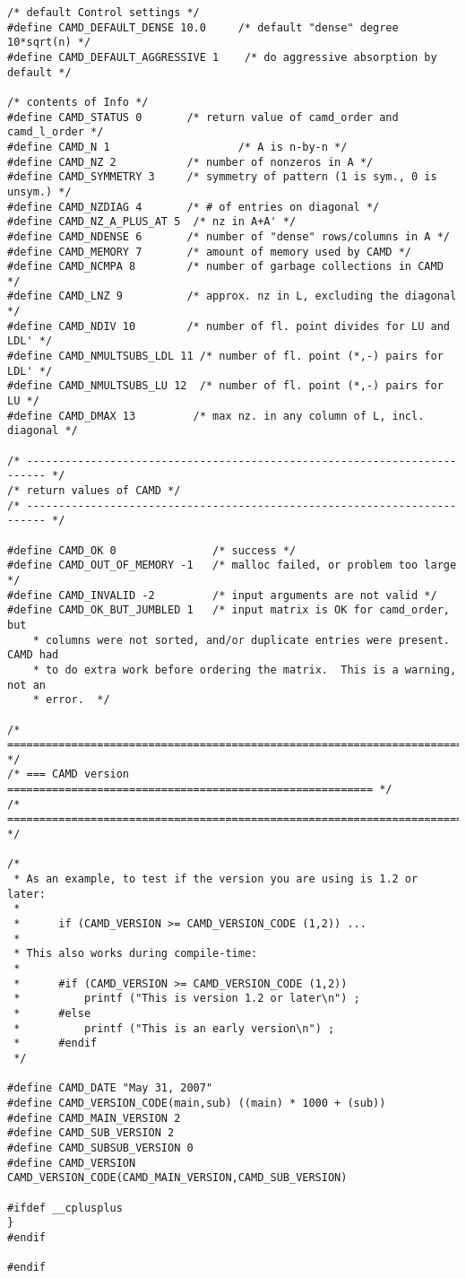 \documentclass[11pt]{article}
\begin{document}
{\begin{verbatim}
/* default Control settings */
#define CAMD_DEFAULT_DENSE 10.0     /* default "dense" degree 10*sqrt(n) */
#define CAMD_DEFAULT_AGGRESSIVE 1    /* do aggressive absorption by default */

/* contents of Info */
#define CAMD_STATUS 0       /* return value of camd_order and camd_l_order */
#define CAMD_N 1                    /* A is n-by-n */
#define CAMD_NZ 2           /* number of nonzeros in A */ 
#define CAMD_SYMMETRY 3     /* symmetry of pattern (1 is sym., 0 is unsym.) */
#define CAMD_NZDIAG 4       /* # of entries on diagonal */
#define CAMD_NZ_A_PLUS_AT 5  /* nz in A+A' */
#define CAMD_NDENSE 6       /* number of "dense" rows/columns in A */
#define CAMD_MEMORY 7       /* amount of memory used by CAMD */
#define CAMD_NCMPA 8        /* number of garbage collections in CAMD */
#define CAMD_LNZ 9          /* approx. nz in L, excluding the diagonal */
#define CAMD_NDIV 10        /* number of fl. point divides for LU and LDL' */
#define CAMD_NMULTSUBS_LDL 11 /* number of fl. point (*,-) pairs for LDL' */
#define CAMD_NMULTSUBS_LU 12  /* number of fl. point (*,-) pairs for LU */
#define CAMD_DMAX 13         /* max nz. in any column of L, incl. diagonal */

/* ------------------------------------------------------------------------- */
/* return values of CAMD */
/* ------------------------------------------------------------------------- */

#define CAMD_OK 0               /* success */
#define CAMD_OUT_OF_MEMORY -1   /* malloc failed, or problem too large */
#define CAMD_INVALID -2         /* input arguments are not valid */
#define CAMD_OK_BUT_JUMBLED 1   /* input matrix is OK for camd_order, but
    * columns were not sorted, and/or duplicate entries were present.  CAMD had
    * to do extra work before ordering the matrix.  This is a warning, not an
    * error.  */

/* ========================================================================== */
/* === CAMD version ========================================================= */
/* ========================================================================== */

/*
 * As an example, to test if the version you are using is 1.2 or later:
 *
 *      if (CAMD_VERSION >= CAMD_VERSION_CODE (1,2)) ...
 *
 * This also works during compile-time:
 *
 *      #if (CAMD_VERSION >= CAMD_VERSION_CODE (1,2))
 *          printf ("This is version 1.2 or later\n") ;
 *      #else
 *          printf ("This is an early version\n") ;
 *      #endif
 */

#define CAMD_DATE "May 31, 2007"
#define CAMD_VERSION_CODE(main,sub) ((main) * 1000 + (sub))
#define CAMD_MAIN_VERSION 2
#define CAMD_SUB_VERSION 2
#define CAMD_SUBSUB_VERSION 0
#define CAMD_VERSION CAMD_VERSION_CODE(CAMD_MAIN_VERSION,CAMD_SUB_VERSION)

#ifdef __cplusplus
}
#endif

#endif
\end{verbatim}
}

\newpage



\end{document}

